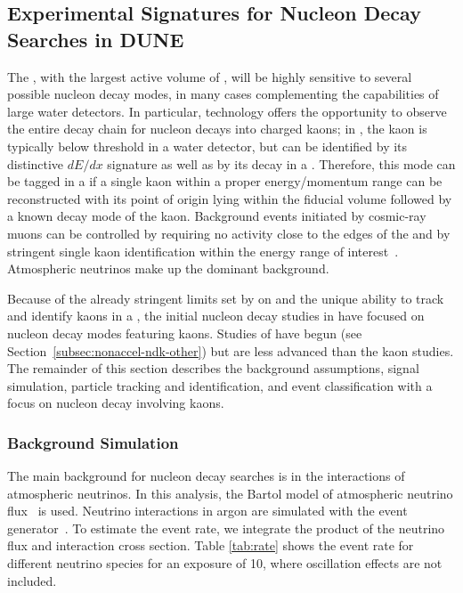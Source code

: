 \subsection{Experimental Signatures for Nucleon Decay Searches in DUNE}
\label{subsec:nonaccel-ndk-dune}

The  , with the largest active volume of , 
will be highly sensitive to several possible nucleon decay modes, 
in many cases complementing the capabilities of large water detectors.
In particular,  technology offers the opportunity to observe the entire decay chain for nucleon decays into charged kaons; in \ptoknubar, the kaon is typically below \cherenkov threshold in a water \cherenkov detector, but can be identified by its distinctive $dE/dx$ signature as well as by its decay in a .
Therefore, this mode can be tagged in a  if a single kaon within a proper energy/momentum range can be reconstructed with its point of origin lying within the fiducial volume followed by a known decay mode of the kaon.
Background events initiated by cosmic-ray muons can be controlled  by requiring no activity close to the edges of the  and by stringent single kaon identification within the energy range of interest~\cite{bib:docdb3384,bib:docdb1752}.  Atmospheric neutrinos make up the dominant background.

Because of the already stringent limits set by \superk on \ptoepizero and the unique ability to track and identify kaons in a , the initial nucleon decay studies in  have focused on nucleon decay modes featuring kaons.  Studies of \ptoepizero have begun (see Section~\ref{subsec:nonaccel-ndk-other}) but are less advanced than the kaon studies.  The remainder of this section describes the background assumptions, signal simulation, particle tracking and identification, and event classification with a focus on nucleon decay involving kaons.

\subsubsection{Background Simulation}
\label{sec:ndkbkgd}

The main background for nucleon decay searches is in the interactions of  atmospheric neutrinos. In this analysis, the Bartol model of atmospheric neutrino flux~\cite{Barr:2004br} is used.
Neutrino interactions in argon are simulated with the  event generator~\cite{Andreopoulos:2009rq}. To estimate the event rate, we integrate the product of the neutrino flux and interaction cross section.
Table \ref{tab:rate} shows the event rate for different neutrino species for an exposure of \SI{10}{\ktyr}, where oscillation effects are not included.

